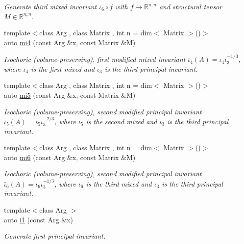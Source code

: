 \begin{DoxyCompactItemize}
\begin{DoxyCompactList}\small\item\em Generate third mixed invariant $ \iota_6\circ f $ with $f\mapsto\mathbb{R}^{n,n}$ and structural tensor $M\in\mathbb{R}^{n,n}$. \end{DoxyCompactList}\item 
{\footnotesize template$<$class Arg , class Matrix , int n = dim$<$ Matrix $>$()$>$ }\\auto \hyperlink{group__InvariantGroup_ga8a80d59d53e7ad96a7dd7fdea9ed4983}{mi4} (const Arg \&x, const Matrix \&M)
\begin{DoxyCompactList}\small\item\em Isochoric (volume-\/preserving), first modified mixed invariant $ \bar\iota_4(A)=\iota_4\iota_3^{-1/3} $, where $\iota_4$ is the first mixed and $\iota_3$ is the third principal invariant. \end{DoxyCompactList}\item 
{\footnotesize template$<$class Arg , class Matrix , int n = dim$<$ Matrix $>$()$>$ }\\auto \hyperlink{group__InvariantGroup_ga5b7f0c80a59eead25db087d9faff597b}{mi5} (const Arg \&x, const Matrix \&M)
\begin{DoxyCompactList}\small\item\em Isochoric (volume-\/preserving), second modified principal invariant $ \bar\iota_5(A)=\iota_5\iota_3^{-2/3} $, where $\iota_5$ is the second mixed and $\iota_3$ is the third principal invariant. \end{DoxyCompactList}\item 
{\footnotesize template$<$class Arg , class Matrix , int n = dim$<$ Matrix $>$()$>$ }\\auto \hyperlink{group__InvariantGroup_gac9e1dba3b52694c37f5e297d49866053}{mi6} (const Arg \&x, const Matrix \&M)
\begin{DoxyCompactList}\small\item\em Isochoric (volume-\/preserving), second modified principal invariant $ \bar\iota_6(A)=\iota_6\iota_3^{-1/3} $, where $\iota_6$ is the third mixed and $\iota_3$ is the third principal invariant. \end{DoxyCompactList}\item 
{\footnotesize template$<$class Arg $>$ }\\auto \hyperlink{group__InvariantGroup_ga84b31b28660514e241f649d3c6f93a7c}{i1} (const Arg \&x)
\begin{DoxyCompactList}\small\item\em Generate first principal invariant. \end{DoxyCompactList}\item 

\end{DoxyCompactItemize}
